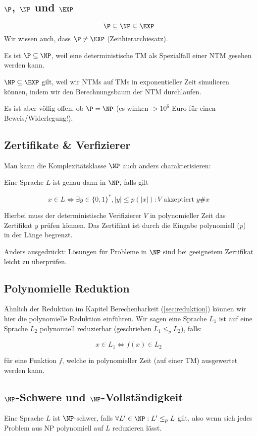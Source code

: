 \documentclass[a4paper,parskip=half*,DIV=7,fontsize=11pt]{scrartcl}
\begin{document}
\subsection[P, NP und EXP]{$\P$, $\NP$ und $\EXP$}
\[ \P \subseteq \NP \subseteq \EXP \]
Wir wissen auch, dass $\P \neq \EXP$ (Zeithierarchiesatz).

Es ist $\P \subseteq \NP$, weil eine deterministische TM als Spezialfall einer NTM gesehen werden kann.

$\NP \subseteq \EXP$ gilt, weil wir NTMs auf TMs in exponentieller Zeit simulieren können, indem wir den Berechnungsbaum der NTM durchlaufen.

Es ist aber völlig offen, ob $\P = \NP$ (es winken $> 10^6$ Euro für einen Beweis/Widerlegung!).

\subsection{Zertifikate \& Verfizierer}
Man kann die Komplexitätsklasse $\NP$ auch anders charakterisieren:

Eine Sprache $L$ ist genau dann in $\NP$, falls gilt

\[x\in L \iff \exists y\in \{0,1\}^*, |y|\leq p(|x|): \text{$V$ akzeptiert $y\#x$}\]

Hierbei muss der deterministische Verifizierer $V$ in polynomieller Zeit das Zertifikat $y$ prüfen können. Das Zertifikat ist durch die Eingabe polynomiell ($p$) in der Länge begrenzt.

Anders ausgedrückt: Lösungen für Probleme in $\NP$ sind bei geeignetem Zertifikat leicht zu überprüfen. 

\subsection{Polynomielle Reduktion}
Ähnlich der Reduktion im Kapitel Berechenbarkeit (\ref{sec:reduktion}) können wir hier die polynomielle Reduktion einführen. Wir sagen eine Sprache  $L_1$ ist auf eine Sprache $L_2$ polynomiell reduzierbar (geschrieben $L_1 \leq_p L_2$), falls:

\[x \in L_1 \iff f(x) \in L_2\]

für eine Funktion $f$, welche in polynomieller Zeit (auf einer TM) ausgewertet werden kann.

\subsection[NP-Schwere und NP-Vollständigkeit]{$\NP$-Schwere und $\NP$-Vollständigkeit}
Eine Sprache $L$ ist $\NP$-schwer, falls $\forall L' \in \NP : L' \leq_p L$ gilt, also wenn sich jedes Problem aus NP polynomiell auf $L$ reduzieren lässt.
\end{document}
